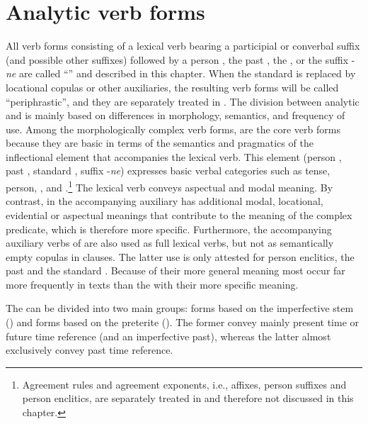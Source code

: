 \chapter{Analytic verb forms}
\label{cpt:Analytic verb forms}

All verb forms consisting of a lexical verb bearing a participial or converbal suffix (and possible other suffixes) followed by a person , the past , the  , or the suffix -\textit{ne} are called ``'' and described in this chapter. When the standard  is replaced by locational copulas or other auxiliaries, the resulting verb forms will be called ``periphrastic'', and they are separately treated in . The division between analytic and  is mainly based on differences in morphology, semantics, and frequency of use. Among the morphologically complex verb forms,  are the core verb forms because they are basic in terms of the semantics and pragmatics of the inflectional element that accompanies the lexical verb. This element (person , past , standard , suffix -\textit{ne}) expresses basic verbal categories such as tense, person, , and .\footnote{Agreement rules and agreement exponents, i.e.,  affixes, person suffixes and person enclitics, are separately treated in  and therefore not discussed in this chapter.} The lexical verb conveys aspectual and modal meaning. By contrast, in  the accompanying auxiliary has additional modal, locational, evidential or aspectual meanings that contribute to the meaning of the complex predicate, which is therefore more specific. Furthermore, the accompanying auxiliary verbs of  are also used as full lexical verbs, but not as semantically empty copulas in  clauses. The latter use is only attested for person enclitics, the past  and the standard . Because of their more general meaning most  occur far more frequently in texts than the  with their more specific meaning.     

The  can be divided into two main groups: forms based on the imperfective stem () and forms based on the preterite (). The former convey mainly present time or future time reference (and an imperfective past), whereas the latter almost exclusively convey past time reference.


